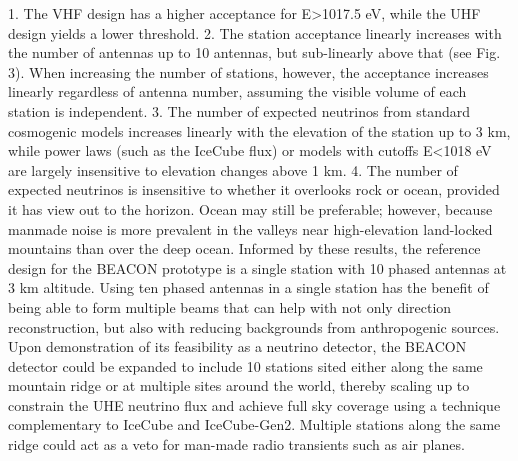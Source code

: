\documentclass[12pt]{article}
\begin{document}
1.	The VHF design has a higher acceptance for E>1017.5 eV, while the UHF design yields a lower threshold.
2.	The station acceptance linearly increases with the number of antennas up to 10 antennas, but sub-linearly above that (see Fig. 3). When increasing the number of stations, however, the acceptance increases linearly regardless of antenna number, assuming the visible volume of each station is independent.
3.	The number of expected neutrinos from standard cosmogenic models increases linearly with the elevation of the station up to 3 km, while power laws (such as the IceCube flux) or models with cutoffs E<1018 eV are largely insensitive to elevation changes above 1 km. 
4.	The number of expected neutrinos is insensitive to whether it overlooks rock or ocean, provided it has view out to the horizon. Ocean may still be preferable; however, because manmade noise is more prevalent in the valleys near high-elevation land-locked mountains than over the deep ocean.
Informed by these results, the reference design for the BEACON prototype is a single station with 10 phased antennas at 3 km altitude. Using ten phased antennas in a single station has the benefit of being able to form multiple beams that can help with not only direction reconstruction, but also with reducing backgrounds from anthropogenic sources. Upon demonstration of its feasibility as a neutrino detector, the BEACON detector could be expanded to include 10 stations sited either along the same mountain ridge or at multiple sites around the world, thereby scaling up to constrain the UHE neutrino flux and achieve full sky coverage using a technique complementary to IceCube and IceCube-Gen2. Multiple stations along the same ridge could act as a veto for man-made radio transients such as air planes. 
\end{document}
